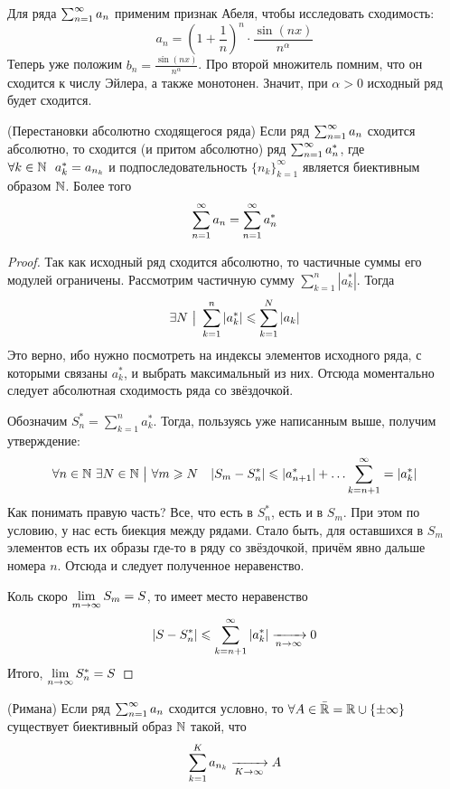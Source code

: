 \begin{example}
	Для ряда $\sum_{n = 1}^\infty a_n$ применим признак Абеля, чтобы исследовать сходимость:
	\[
		a_n = \left(1 + \frac{1}{n}\right)^n \cdot \frac{\sin(nx)}{n^\alpha}
	\]
	Теперь уже положим $b_n = \frac{\sin(nx)}{n^\alpha}$. Про второй множитель помним, что он сходится к числу Эйлера, а также монотонен. Значит, при $\alpha > 0$ исходный ряд будет сходится.
\end{example}

\begin{theorem} (Перестановки абсолютно сходящегося ряда)
	Если ряд $\sum_{n = 1}^\infty a_n$ сходится абсолютно, то сходится (и притом абсолютно) ряд $\sum_{n = 1}^\infty a^*_n$, где $\forall k \in \N\ \ a^*_k = a_{n_k}$ и подпоследовательность $\{n_k\}_{k = 1}^\infty$ является биективным образом $\mathbb{N}$. Более того
	\[
		\sum_{n = 1}^\infty a_n = \sum_{n = 1}^\infty a^*_n
	\]
\end{theorem}

\begin{proof}
	Так как исходный ряд сходится абсолютно, то частичные суммы его модулей ограничены. Рассмотрим частичную сумму $\sum_{k = 1}^n |a^*_k|$. Тогда
	\[
		\exists N \ \big|\  \sum\limits_{k = 1}^n |a^*_k| \leqslant \sum\limits_{k = 1}^N |a_k|
	\]
	Это верно, ибо нужно посмотреть на индексы элементов исходного ряда, с которыми связаны $a^*_k$, и выбрать максимальный из них. Отсюда моментально следует абсолютная сходимость ряда со звёздочкой.
	
	Обозначим $S^*_n = \sum_{k = 1}^n a^*_k$. Тогда, пользуясь уже написанным выше, получим утверждение:
	\[
		\forall n \in \mathbb{N}\ \exists N \in \mathbb{N} \ \big|\  \forall m \geqslant N \quad |S_m - S^*_n| \leqslant |a^*_{n + 1}| + \ldots \sum\limits_{k = n + 1}^\infty = |a^*_k|
	\]
	Как понимать правую часть? Все, что есть в $S^*_n$, есть и в $S_m$. При этом по условию, у нас есть биекция между рядами. Стало быть, для оставшихся в $S_m$ элементов есть их образы где-то в ряду со звёздочкой, причём явно дальше номера $n$. Отсюда и следует полученное неравенство.
	
	Коль скоро $\lim\limits_{m \to \infty} S_m = S$, то имеет место неравенство
	\[
		|S - S^*_n| \leqslant \sum\limits_{k = n + 1}^\infty |a^*_k| \xrightarrow[n \to \infty]{} 0
	\]
	Итого, $\lim\limits_{n \to \infty} S^*_n = S$
\end{proof}

\begin{theorem} (Римана)
	Если ряд $\sum_{n = 1}^\infty a_n$ сходится условно, то $\forall A \in \bar{\mathbb{R}} = \mathbb{R} \cup \{\pm \infty\}$ существует биективный образ $\mathbb{N}$ такой, что
	\[
		\sum\limits_{k = 1}^K a_{n_k} \xrightarrow[K \to \infty]{} A
	\]
\end{theorem}

